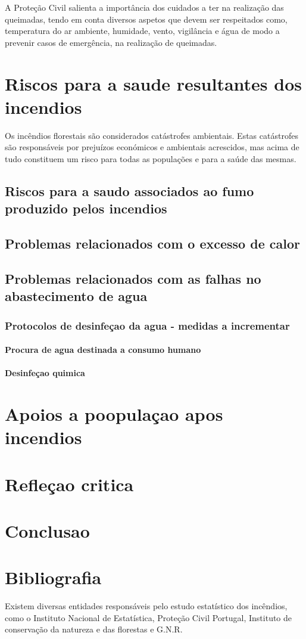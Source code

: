 \documentclass[a4paper,11pt,onecloumn,oneside]{article}
\begin{document}
A Proteção Civil salienta a importância dos cuidados a ter na realização das queimadas, tendo em conta diversos aspetos que devem ser respeitados como, temperatura do ar ambiente, humidade, vento, vigilância e água de modo a prevenir casos de emergência, na realização de queimadas.

\part{Riscos para a saude resultantes dos incendios}
Os incêndios florestais são considerados catástrofes ambientais. Estas catástrofes são responsáveis por prejuízos económicos e ambientais acrescidos, mas acima de tudo constituem um risco para todas as populações e para a saúde das mesmas.

\chapter{Riscos para a saudo associados ao fumo produzido pelos incendios}

\chapter{Problemas relacionados com o excesso de calor}


\chapter{Problemas relacionados com as falhas no abastecimento de agua}

\section{Protocolos de desinfeçao da agua - medidas a incrementar}

\subsection{Procura de agua destinada a consumo humano}
\subsection{Desinfeçao quimica}

\part{Apoios a poopulaçao apos incendios}

\part{Refleçao critica}

\part{Conclusao}

\part{Bibliografia}

Existem diversas entidades responsáveis pelo estudo estatístico dos incêndios, como o Instituto Nacional de Estatística, Proteção Civil Portugal, Instituto de conservação da natureza e das florestas e G.N.R.
\end{document}
